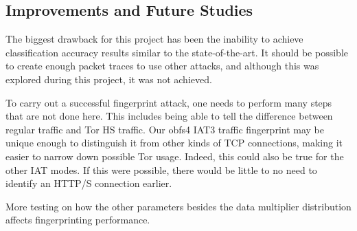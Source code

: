 \documentclass[11pt]{article}
\begin{document}
\subsection{Improvements and Future Studies}
The biggest drawback for this project has been the inability to achieve classification accuracy results similar to the state-of-the-art. It should be possible to create enough packet traces to use other attacks, and although this was explored during this project, it was not achieved.

To carry out a successful fingerprint attack, one needs to perform many steps that are not done here. This includes being able to tell the difference between regular traffic and Tor HS traffic. Our obfs4 IAT3 traffic fingerprint may be unique enough to distinguish it from other kinds of TCP connections, making it easier to narrow down possible Tor usage. Indeed, this could also be true for the other IAT modes. If this were possible, there would be little to no need to identify an HTTP/S connection earlier.

More testing on how the other parameters besides the data multiplier distribution affects fingerprinting performance.

\printbibliography
\end{document}
